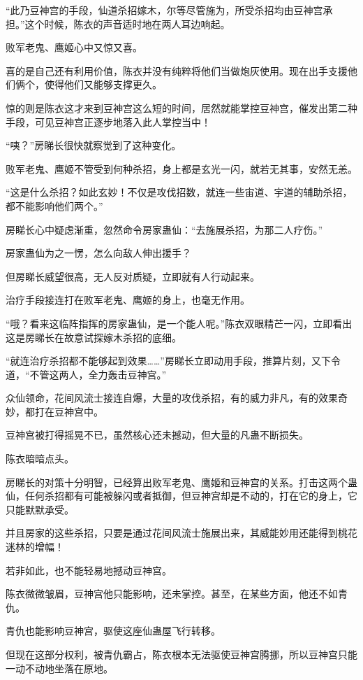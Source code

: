 \begin{this_body}
“此乃豆神宫的手段，仙道杀招嫁木，尔等尽管施为，所受杀招均由豆神宫承担。”这个时候，陈衣的声音适时地在两人耳边响起。

败军老鬼、鹰姬心中又惊又喜。

喜的是自己还有利用价值，陈衣并没有纯粹将他们当做炮灰使用。现在出手支援他们俩个，使得他们又能够支撑更久。

惊的则是陈衣这才来到豆神宫这么短的时间，居然就能掌控豆神宫，催发出第二种手段，可见豆神宫正逐步地落入此人掌控当中！

“咦？”房睇长很快就察觉到了这种变化。

败军老鬼、鹰姬不管受到何种杀招，身上都是玄光一闪，就若无其事，安然无恙。

“这是什么杀招？如此玄妙！不仅是攻伐招数，就连一些宙道、宇道的辅助杀招，都不能影响他们两个。”

房睇长心中疑虑渐重，忽然命令房家蛊仙：“去施展杀招，为那二人疗伤。”

房家蛊仙为之一愣，怎么向敌人伸出援手？

但房睇长威望很高，无人反对质疑，立即就有人行动起来。

治疗手段接连打在败军老鬼、鹰姬的身上，也毫无作用。

“哦？看来这临阵指挥的房家蛊仙，是一个能人呢。”陈衣双眼精芒一闪，立即看出这是房睇长在故意试探嫁木杀招的底细。

“就连治疗杀招都不能够起到效果……”房睇长立即动用手段，推算片刻，又下令道，“不管这两人，全力轰击豆神宫。”

众仙领命，花间风流士接连自爆，大量的攻伐杀招，有的威力非凡，有的效果奇妙，都打在豆神宫中。

豆神宫被打得摇晃不已，虽然核心还未撼动，但大量的凡蛊不断损失。

陈衣暗暗点头。

房睇长的对策十分明智，已经算出败军老鬼、鹰姬和豆神宫的关系。打击这两个蛊仙，任何杀招都有可能被躲闪或者抵御，但豆神宫却是不动的，打在它的身上，它只能默默承受。

并且房家的这些杀招，只要是通过花间风流士施展出来，其威能妙用还能得到桃花迷林的增幅！

若非如此，也不能轻易地撼动豆神宫。

陈衣微微皱眉，豆神宫他只能影响，还未掌控。甚至，在某些方面，他还不如青仇。

青仇也能影响豆神宫，驱使这座仙蛊屋飞行转移。

但现在这部分权利，被青仇霸占，陈衣根本无法驱使豆神宫腾挪，所以豆神宫只能一动不动地坐落在原地。


\end{this_body}
